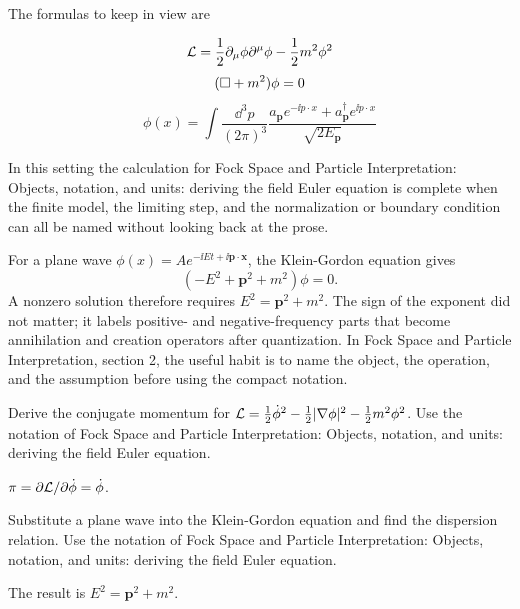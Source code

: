 The formulas to keep in view are

\[
  \mathcal L=\frac12\partial_\mu\phi\partial^\mu\phi-\frac12m^2\phi^2
\]
\[
  (\Box+m^2)\phi=0
\]
\[
  \phi(x)=\int\frac{\dd^3p}{(2\pi)^3}\frac{a_{\bm p}e^{-\ii p\cdot x}+a_{\bm p}^\dagger e^{\ii p\cdot x}}{\sqrt{2E_{\bm p}}}
\]

In this setting the calculation for Fock Space and Particle Interpretation: Objects, notation, and units: deriving the field Euler equation is complete when the finite model, the limiting step, and the normalization or boundary condition can all be named without looking back at the prose.




\begin{example}
For a plane wave \(\phi(x)=Ae^{-\ii Et+\ii\bm p\cdot\bm x}\), the Klein-Gordon equation gives
\[
  (-E^2+\bm p^2+m^2)\phi=0.
\]
A nonzero solution therefore requires \(E^2=\bm p^2+m^2\).  The sign of the exponent did not matter; it labels positive- and negative-frequency parts that become annihilation and creation operators after quantization.  In Fock Space and Particle Interpretation, section 2, the useful habit is to name the object, the operation, and the assumption before using the compact notation.
\end{example}



\begin{exercise}
Derive the conjugate momentum for \(\mathcal L=\frac12\dot\phi^2-\frac12|\nabla\phi|^2-\frac12m^2\phi^2\).  Use the notation of Fock Space and Particle Interpretation: Objects, notation, and units: deriving the field Euler equation.
\begin{answer}
\(\pi=\partial\mathcal L/\partial\dot\phi=\dot\phi\).
\end{answer}
\end{exercise}

\begin{exercise}
Substitute a plane wave into the Klein-Gordon equation and find the dispersion relation.  Use the notation of Fock Space and Particle Interpretation: Objects, notation, and units: deriving the field Euler equation.
\begin{answer}
The result is \(E^2=\bm p^2+m^2\).
\end{answer}
\end{exercise}




